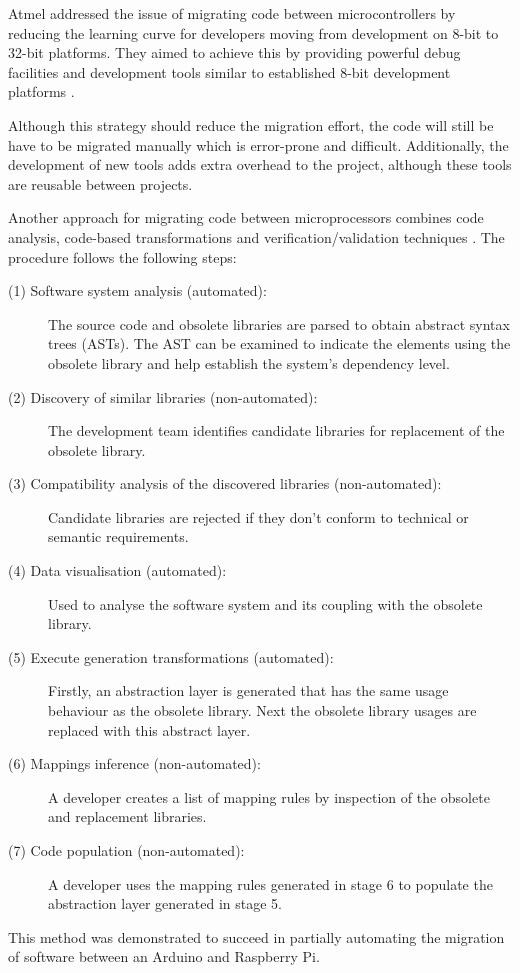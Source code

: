 \documentclass{UoYCSproject}
\begin{document}
Atmel addressed the issue of migrating code between microcontrollers by reducing the learning curve for developers moving from development on 8-bit to 32-bit platforms. They aimed to achieve this by providing powerful debug facilities and development tools similar to established 8-bit development platforms \parencite{wilbrink2004facilitating}.

Although this strategy should reduce the migration effort, the code will still be have to be migrated manually which is error-prone and difficult. Additionally, the development of new tools adds extra overhead to the project, although these tools are reusable between projects.

Another approach for migrating code between microprocessors combines code analysis, code-based transformations and verification/validation techniques \parencite{gerasimou2017technical}. The procedure follows the following steps:
\begin{description}
\item[(1) Software system analysis (automated):] The source code and obsolete libraries are parsed to obtain abstract syntax trees (ASTs). The AST can be examined to indicate the elements using the obsolete library and help establish the system's dependency level.
\item[(2) Discovery of similar libraries (non-automated):] The development team identifies candidate libraries for replacement of the obsolete library.
\item[(3) Compatibility analysis of the discovered libraries (non-automated):] Candidate libraries are rejected if they don't conform to technical or semantic requirements.
\item[(4) Data visualisation (automated):] Used to analyse the software system and its coupling with the obsolete library.
\item[(5) Execute generation transformations (automated):] Firstly, an abstraction layer is generated that has the same usage behaviour as the obsolete library. Next the obsolete library usages are replaced with this abstract layer.
\item[(6) Mappings inference (non-automated):] A developer creates a list of mapping rules by inspection of the obsolete and replacement libraries.
\item[(7) Code population (non-automated):] A developer uses the mapping rules generated in stage 6 to populate the abstraction layer generated in stage 5.
\end{description}
This method was demonstrated to succeed in partially automating the migration of software between an Arduino and Raspberry Pi.
\end{document}
